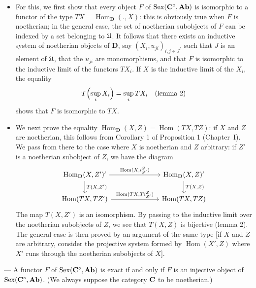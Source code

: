 \begin{itemize}
\item[---] For this, we first show that every object $F$ of
      $\operatorname{Sex}(\mathbf{C}^{\circ},\mathbf{Ab})$ is isomorphic to a functor of
      the type $TX = \operatorname{Hom}_{\mathbf{D}}(.,X)$: this is
      obviously true when $F$ is noetherian; in the general case, the set
      of noetherian subobjects of $F$ can be indexed by a set belonging to
      $\mathfrak{U}$. It follows that there exists an inductive system of
      noetherian objects of $\mathbf{D}$, say $(X_i,u_{ji})_{i,j\in J}$,
      such that $J$ is an element of $\mathfrak{U}$, that the $u_{ji}$ are
      monomorphisms, and that $F$ is isomorphic to the inductive limit of
      the functors $TX_i$. If $X$ is the inductive limit of the $X_i$, the
      equality
      \[
        T\Bigl(\sup_i X_i\Bigr) = \sup_i TX_i \quad\text{(lemma 2)}
      \]
      shows that $F$ is isomorphic to $TX$.

\item[---] We next prove the equality
      $\operatorname{Hom}_{\mathbf{D}}(X,Z) = \operatorname{Hom}(TX,TZ)$:
      if $X$ and $Z$ are noetherian, this follows from Corollary 1 of
      Proposition 1 (Chapter~I). We pass from there to the case where $X$ is
      noetherian and $Z$ arbitrary: if $Z'$ is a noetherian subobject of
      $Z$, we have the diagram
      \[
      \begin{tikzcd}[column sep=7em]
      \operatorname{Hom}_{\mathbf{D}}(X,Z')
        \arrow[r, "{\operatorname{Hom}(X,i^{Z}_{Z'})}"]
        \arrow[d, "{T(X,Z')}"]' &
      \operatorname{Hom}_{\mathbf{D}}(X,Z)
        \arrow[d, "{T(X,Z)}"]' \\
      \operatorname{Hom}(TX,TZ')
        \arrow[r, "{\operatorname{Hom}(TX,T i^{Z}_{Z'})}"] &
      \operatorname{Hom}(TX,TZ)
      \end{tikzcd}
      \]
      The map $T(X,Z')$ is an isomorphism. By passing to the inductive limit
      over the noetherian subobjects of $Z$, we see that $T(X,Z)$ is bijective
      (lemma 2). The general case is then proved by an argument of the same
      type [if $X$ and $Z$ are arbitrary, consider the projective system
      formed by $\operatorname{Hom}(X',Z)$ where $X'$ runs through the
      noetherian subobjects of $X$].
\end{itemize}

\begin{lemma}
--- A functor $F$ of $\operatorname{Sex}(\mathbf{C}^{\circ},\mathbf{Ab})$ is exact if and
only if $F$ is an injective object of $\operatorname{Sex}(\mathbf{C}^{\circ},\mathbf{Ab})$.
(We always suppose the category $\mathbf{C}$ to be noetherian.)
\end{lemma}

